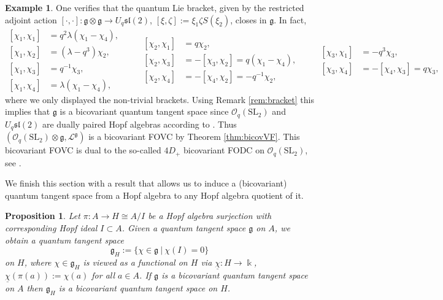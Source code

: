 \documentclass{article}
\newtheorem{proposition}[thm]{Proposition}
\theoremstyle{definition}
\newtheorem{example}[thm]{Example}
\newcommand{\cO}{{\mathcal{O}}}
\newcommand{\rSL}{{\mathrm{SL}}}
\begin{document}
\begin{example}
		One verifies that the quantum Lie bracket, given by the restricted adjoint action $[\cdot,\cdot]\colon\mathfrak{g}\otimes\mathfrak{g}\to U_q\mathfrak{sl}(2)$, $[\xi,\zeta]:=\xi_1\zeta S(\xi_2)$, closes in $\mathfrak{g}$. In fact,
		\begin{equation}\label{eq:qbracket}
			\begin{split}
				[\chi_1,\chi_1]
				&=q^2\lambda(\chi_1-\chi_4),\\
				[\chi_1,\chi_2]
				&=(\lambda-q^3)\chi_2,\\
				[\chi_1,\chi_3]
				&=q^{-1}\chi_3,\\
				[\chi_1,\chi_4]
				&=\lambda(\chi_1-\chi_4),    
			\end{split}\qquad
			\begin{split}
				[\chi_2,\chi_1]
				&=q\chi_2,\\
				[\chi_2,\chi_3]
				&=-[\chi_3,\chi_2]=q(\chi_1-\chi_4),\\
				[\chi_2,\chi_4]
				&=-[\chi_4,\chi_2]=-q^{-1}\chi_2,
			\end{split}\qquad
			\begin{split}
				[\chi_3,\chi_1]
				&=-q^{3}\chi_3,\\
				[\chi_3,\chi_4]
				&=-[\chi_4,\chi_3]=q\chi_3,
			\end{split}
		\end{equation}
		where we only displayed the non-trivial brackets. Using Remark \ref{rem:bracket} this implies that $\mathfrak{g}$ is a bicovariant quantum tangent space since $\mathcal{O}_q(\mathrm{SL}_2)$ and $U_q\mathfrak{sl}(2)$ are dually paired Hopf algebras according to \cite[Section 4.4.1]{ks}. Thus $(\cO_q(\rSL_2)\otimes \mathfrak{g}, \mathscr{L}^{\mathfrak{g}})$ is a bicovariant FOVC by Theorem \ref{thm:bicovVF}. This bicovariant FOVC is dual to the so-called $4D_+$ bicovariant FODC on $\mathcal{O}_q(\mathrm{SL}_2)$, see \cite{Woronowicz1989}.
	\end{example}
	We finish this section with a result that allows us to induce a (bicovariant) quantum tangent space from a Hopf algebra to any Hopf algebra quotient of it.
	\begin{proposition}\label{prop:quotientFOVC}
		Let $\pi\colon A\to H\cong A/I$ be a Hopf algebra surjection with corresponding Hopf ideal $I\subset A$. Given a quantum tangent space $\mathfrak{g}$ on $A$, we obtain a quantum tangent space
		\begin{equation}
			\mathfrak{g}_H:=\{\chi\in\mathfrak{g}~|~\chi(I)=0\}
		\end{equation}
		on $H$, where $\chi\in\mathfrak{g}_H$ is viewed as a functional on $H$ via $\underline{\chi}\colon H\to\Bbbk$, $\underline{\chi}(\pi(a)):=\chi(a)$ for all $a\in A$. If $\mathfrak{g}$ is a bicovariant quantum tangent space on $A$ then $\mathfrak{g}_H$ is a bicovariant quantum tangent space on $H$.%
\end{proposition}
\end{document}
